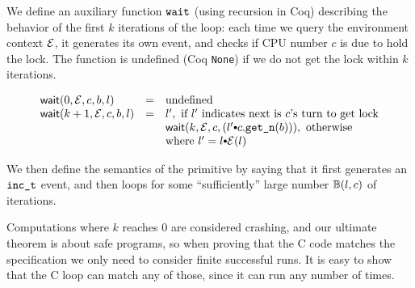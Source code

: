 {We define an auxiliary function $\comm{wait}$
(using recursion in Coq) describing the behavior of the first $k$
iterations of the loop: each time we query the environment
context $\oracle$, it generates its own
event, and checks if CPU number $c$ is due to hold the
lock. The function is undefined (Coq {\tt None}) if we do not get the
lock within $k$ iterations.
\begin{small}
\[
\begin{array}{lcl}
\mathsf{wait}(0, \oracle, c, b, l) & = &\text{undefined} \\
\mathsf{wait}(k+1, \oracle, c, b, l) & = & l', \text{ if $l'$ indicates next is $c$'s turn to get lock}\\
                       & &   \mathsf{wait}(k, \oracle, c,  (l' \cons c.\getnow(b))), \text{ otherwise} \\
                       & &  \text{where }l' = l \cons  \oracle(l)
\end{array}
\]
\end{small}%

We then define the semantics of the primitive by saying that it first
generates an $\incticket$ event, and then loops
for some ``sufficiently'' large number $\calwait(l, c)$ of iterations.
\begin{small}
\begin{mathpar}
\end{mathpar}
\end{small}

Computations where $k$ reaches 0 are considered crashing, and our
ultimate theorem is about safe programs, so when proving that the C
code matches the specification we only need to consider finite
successful runs. It is easy to show that the C loop can match any of
those, since it can run any number of times.

}
